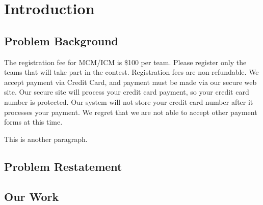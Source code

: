 \section{Introduction}\label{sec:intro}

\subsection{Problem Background}


The registration fee for MCM/ICM is \$100 per team. Please register only the teams that will take part in the contest. Registration fees are non-refundable. We accept payment via Credit Card, and payment must be made via our secure web site. Our secure site will process your credit card payment, so your credit card number is protected. Our system will not store your credit card number after it processes your payment. We regret that we are not able to accept other payment forms at this time.


This is another paragraph.

\subsection{Problem Restatement}

\subsection{Our Work}
